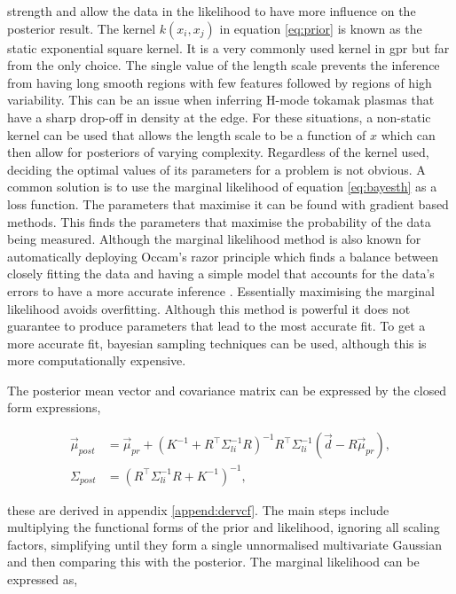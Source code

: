 strength and allow the data in the likelihood to have more influence on the posterior result. The kernel $k(x_i,x_j)$ in equation \ref{eq:prior} is known as the static exponential square kernel. It is a very commonly used kernel in \gls{gpr} but far from the only choice. The single value of the length scale prevents the inference from having long smooth regions with few features followed by regions of high variability. This can be an issue when inferring H-mode tokamak plasmas that have a sharp drop-off in density at the edge. For these situations, a non-static kernel can be used that allows the length scale to be a function of $x$ which can then allow for posteriors of varying complexity. Regardless of the kernel used, deciding the optimal values of its parameters for a problem is not obvious. A common solution is to use the marginal likelihood of equation \ref{eq:bayesth} as a loss function. The parameters that maximise it can be found with gradient based methods. This finds the parameters that maximise the probability of the data being measured. Although the marginal likelihood method is also known for automatically deploying Occam's razor principle which finds a balance between closely fitting the data and having a simple model that accounts for the data's errors to have a more accurate inference \cite{oscraz} \cite{gp4ml}. Essentially maximising the marginal likelihood avoids overfitting. Although this method is powerful it does not guarantee to produce parameters that lead to the most accurate fit. To get a more accurate fit, bayesian sampling techniques can be used, although this is more computationally expensive. 

The posterior mean vector and covariance matrix can be expressed by the closed form expressions,

\begin{align}
\label{eq:mupost}
\vec \mu_{post} &= \vec{\mu}_{pr} + (K^{-1} + R^{\top} \Sigma_{li}^{-1} R)^{-1} R^{\top} \Sigma_{li}^{-1} (\vec{d} - R \vec{\mu}_{pr}),\\
\label{eq:covpost}
\Sigma_{post} &= \left(R^\top \Sigma_{li}^{-1} R + K^{-1}\right)^{-1},
\end{align}

\noindent these are derived in appendix \ref{append:dervcf}. The main steps include multiplying the functional forms of the prior and likelihood, ignoring all scaling factors, simplifying until they form a single unnormalised multivariate Gaussian and then comparing this with the posterior. The marginal likelihood can be expressed as,

